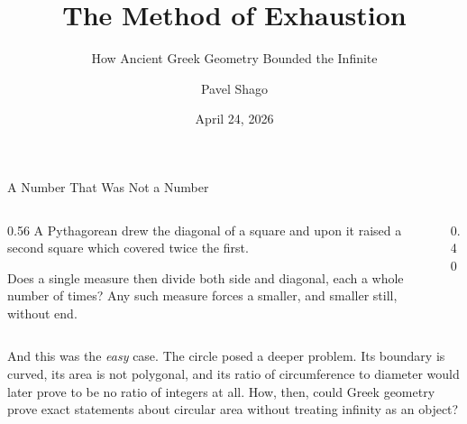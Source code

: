\documentclass[aspectratio=169]{beamer}
\title[Method of Exhaustion]{The Method of Exhaustion}
\subtitle{How Ancient Greek Geometry Bounded the Infinite}
\author{Pavel Shago}
\institute{
        Saint Petersburg State University\\
        \vspace{0.2cm}
        History of Mathematics in English
}
\date{\small April 24, 2026}
\begin{document}
\frame{\titlepage}


\begin{frame}{A Number That Was Not a Number}
        \begin{columns}
                \begin{column}{0.56\textwidth}
                        A Pythagorean drew the diagonal of a square
                        and upon it raised a second square which
                        covered twice the first.

                        \vspace{0.6em}
                        Does a single measure then divide both side
                        and diagonal, each a whole number of times?
                        Any such measure forces
                        a smaller, and smaller still, without end.
                \end{column}
                
                \begin{column}{0.40\textwidth}
                        \centering
                \end{column}
        \end{columns}

        \begin{shadowbox}
                And this was the \emph{easy} case. The circle posed a deeper
                problem. Its boundary is curved, its area is not polygonal, and
                its ratio of circumference to diameter would later prove to be
                no ratio of integers at all. How, then, could Greek geometry
                prove exact statements about circular area without treating
                infinity as an object?
        \end{shadowbox}
\end{frame}
\end{document}
